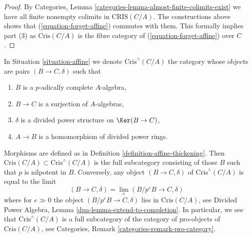 \begin{proof}
\medskip\noindent
By Categories, Lemma \ref{categories-lemma-almost-finite-colimits-exist}
we have all finite nonempty colimits in $\text{CRIS}(C/A)$. The constructions
above shows that (\ref{equation-forget-affine}) commutes with them.
This formally implies part (3) as $\text{Cris}(C/A)$ is the fibre category
of (\ref{equation-forget-affine}) over $C$.
\end{proof}

\begin{remark}
\label{remark-completed-affine-site}
In Situation \ref{situation-affine} we denote
$\text{Cris}^\wedge(C/A)$ the category whose objects are
pairs $(B \to C, \delta)$ such that
\begin{enumerate}
\item $B$ is a $p$-adically complete $A$-algebra,
\item $B \to C$ is a surjection of $A$-algebras,
\item $\delta$ is a divided power structure on $\Ker(B \to C)$,
\item $A \to B$ is a homomorphism of divided power rings.
\end{enumerate}
Morphisms are defined as in Definition \ref{definition-affine-thickening}.
Then $\text{Cris}(C/A) \subset \text{Cris}^\wedge(C/A)$ is the full
subcategory consisting of those $B$ such that $p$ is nilpotent in $B$.
Conversely, any object $(B \to C, \delta)$ of $\text{Cris}^\wedge(C/A)$
is equal to the limit
$$
(B \to C, \delta) = \lim_e (B/p^eB \to C, \delta)
$$
where for $e \gg 0$ the object $(B/p^eB \to C, \delta)$ lies
in $\text{Cris}(C/A)$, see
Divided Power Algebra, Lemma \ref{dpa-lemma-extend-to-completion}.
In particular, we see that $\text{Cris}^\wedge(C/A)$ is a full subcategory
of the category of pro-objects of $\text{Cris}(C/A)$, see
Categories, Remark \ref{categories-remark-pro-category}.
\end{remark}

